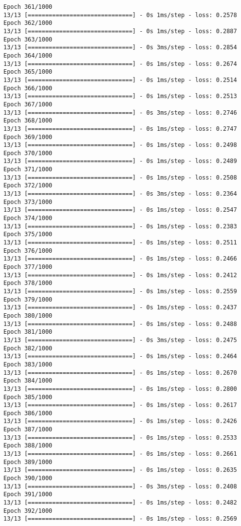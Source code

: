 \documentclass[11pt]{article}
\begin{document}
\begin{Verbatim}[commandchars=\\\{\}]
Epoch 361/1000
13/13 [==============================] - 0s 1ms/step - loss: 0.2578
Epoch 362/1000
13/13 [==============================] - 0s 1ms/step - loss: 0.2887
Epoch 363/1000
13/13 [==============================] - 0s 3ms/step - loss: 0.2854
Epoch 364/1000
13/13 [==============================] - 0s 1ms/step - loss: 0.2674
Epoch 365/1000
13/13 [==============================] - 0s 1ms/step - loss: 0.2514
Epoch 366/1000
13/13 [==============================] - 0s 1ms/step - loss: 0.2513
Epoch 367/1000
13/13 [==============================] - 0s 3ms/step - loss: 0.2746
Epoch 368/1000
13/13 [==============================] - 0s 1ms/step - loss: 0.2747
Epoch 369/1000
13/13 [==============================] - 0s 1ms/step - loss: 0.2498
Epoch 370/1000
13/13 [==============================] - 0s 1ms/step - loss: 0.2489
Epoch 371/1000
13/13 [==============================] - 0s 1ms/step - loss: 0.2508
Epoch 372/1000
13/13 [==============================] - 0s 3ms/step - loss: 0.2364
Epoch 373/1000
13/13 [==============================] - 0s 1ms/step - loss: 0.2547
Epoch 374/1000
13/13 [==============================] - 0s 1ms/step - loss: 0.2383
Epoch 375/1000
13/13 [==============================] - 0s 1ms/step - loss: 0.2511
Epoch 376/1000
13/13 [==============================] - 0s 1ms/step - loss: 0.2466
Epoch 377/1000
13/13 [==============================] - 0s 1ms/step - loss: 0.2412
Epoch 378/1000
13/13 [==============================] - 0s 1ms/step - loss: 0.2559
Epoch 379/1000
13/13 [==============================] - 0s 1ms/step - loss: 0.2437
Epoch 380/1000
13/13 [==============================] - 0s 1ms/step - loss: 0.2488
Epoch 381/1000
13/13 [==============================] - 0s 3ms/step - loss: 0.2475
Epoch 382/1000
13/13 [==============================] - 0s 1ms/step - loss: 0.2464
Epoch 383/1000
13/13 [==============================] - 0s 1ms/step - loss: 0.2670
Epoch 384/1000
13/13 [==============================] - 0s 1ms/step - loss: 0.2800
Epoch 385/1000
13/13 [==============================] - 0s 1ms/step - loss: 0.2617
Epoch 386/1000
13/13 [==============================] - 0s 1ms/step - loss: 0.2426
Epoch 387/1000
13/13 [==============================] - 0s 1ms/step - loss: 0.2533
Epoch 388/1000
13/13 [==============================] - 0s 1ms/step - loss: 0.2661
Epoch 389/1000
13/13 [==============================] - 0s 1ms/step - loss: 0.2635
Epoch 390/1000
13/13 [==============================] - 0s 3ms/step - loss: 0.2408
Epoch 391/1000
13/13 [==============================] - 0s 1ms/step - loss: 0.2482
Epoch 392/1000
13/13 [==============================] - 0s 1ms/step - loss: 0.2569

\end{Verbatim}
\end{document}
